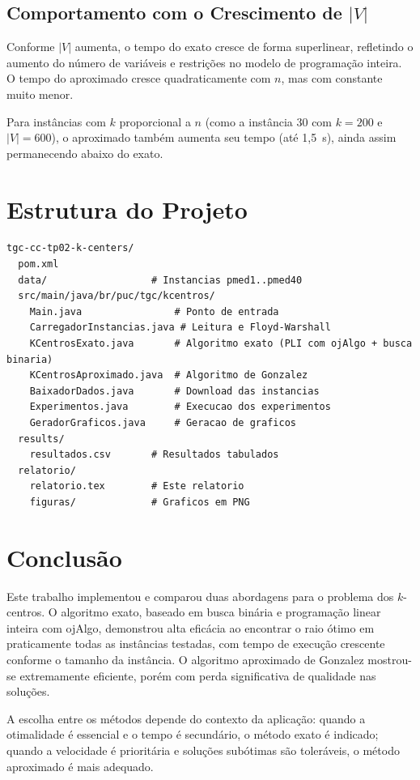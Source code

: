 \documentclass[12pt,a4paper]{article}
\begin{document}
\subsection{Comportamento com o Crescimento de $|V|$}

Conforme $|V|$ aumenta, o tempo do exato cresce de forma superlinear, refletindo o aumento do número de variáveis e restrições no modelo de programação inteira. O tempo do aproximado cresce quadraticamente com $n$, mas com constante muito menor.

Para instâncias com $k$ proporcional a $n$ (como a instância 30 com $k=200$ e $|V|=600$), o aproximado também aumenta seu tempo (até 1,5~s), ainda assim permanecendo abaixo do exato.

\section{Estrutura do Projeto}

\begin{lstlisting}
tgc-cc-tp02-k-centers/
  pom.xml
  data/                  # Instancias pmed1..pmed40
  src/main/java/br/puc/tgc/kcentros/
    Main.java                # Ponto de entrada
    CarregadorInstancias.java # Leitura e Floyd-Warshall
    KCentrosExato.java       # Algoritmo exato (PLI com ojAlgo + busca binaria)
    KCentrosAproximado.java  # Algoritmo de Gonzalez
    BaixadorDados.java       # Download das instancias
    Experimentos.java        # Execucao dos experimentos
    GeradorGraficos.java     # Geracao de graficos
  results/
    resultados.csv       # Resultados tabulados
  relatorio/
    relatorio.tex        # Este relatorio
    figuras/             # Graficos em PNG
\end{lstlisting}

\section{Conclusão}

Este trabalho implementou e comparou duas abordagens para o problema dos $k$-centros. O algoritmo exato, baseado em busca binária e programação linear inteira com ojAlgo, demonstrou alta eficácia ao encontrar o raio ótimo em praticamente todas as instâncias testadas, com tempo de execução crescente conforme o tamanho da instância. O algoritmo aproximado de Gonzalez mostrou-se extremamente eficiente, porém com perda significativa de qualidade nas soluções.

A escolha entre os métodos depende do contexto da aplicação: quando a otimalidade é essencial e o tempo é secundário, o método exato é indicado; quando a velocidade é prioritária e soluções subótimas são toleráveis, o método aproximado é mais adequado.
\end{document}
